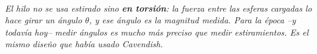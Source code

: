 \begin{center}
\begin{tikzpicture}[scale=1]
\end{tikzpicture}\\[0.5em]
{\small\itshape El hilo no se usa estirado sino \textbf{en torsión}: la fuerza
entre las esferas cargadas lo hace girar un ángulo $\theta$, y ese ángulo es la
magnitud medida. Para la época --y todavía hoy-- medir ángulos es mucho más
preciso que medir estiramientos. Es el mismo diseño que había usado Cavendish.}
\end{center}
